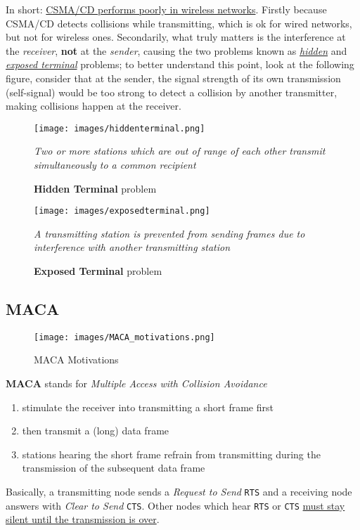 In short: \ul{CSMA/CD performs poorly in wireless networks}.
Firstly because CSMA/CD detects collisions while transmitting, which is ok for wired networks, but not for wireless ones.
Secondarily, what truly matters is the interference at the \textit{receiver}, \textbf{not} at the \textit{sender}, causing the two problems known as \textit{\ul{hidden}} and \ul{\textit{exposed terminal}} problems;
to better understand this point, look at the following figure, consider that at the sender, the signal strength of its own transmission (self-signal) would be too strong to detect a collision by another transmitter, making collisions happen at the receiver.

\begin{figure}[htbp]
   \centering
   \texttt{[image: images/hiddenterminal.png]}
   \caption{\textbf{Hidden Terminal} problem}
   \textit{Two or more stations which are out of range of each other transmit simultaneously to a common
   recipient}
   \label{fig:hiddenterminal}
\end{figure}


\begin{figure}[htbp]
   \centering
   \texttt{[image: images/exposedterminal.png]}
   \caption{\textbf{Exposed Terminal} problem}
   \textit{A transmitting station is prevented from sending frames due to interference with another
   transmitting station}
   \label{fig:exposedterminal}
\end{figure}

\newpage
\subsection{MACA}
\begin{figure}[htbp]
   \centering
   \texttt{[image: images/MACA\_motivations.png]}
   \caption{MACA Motivations}
   \label{fig:MACA_motivations}
\end{figure}

\textbf{MACA} stands for \textit{Multiple Access with Collision Avoidance}
\begin{enumerate}
   \item stimulate the receiver into transmitting a short
   frame first
   \item then transmit a (long) data frame
   \item stations hearing the short frame refrain from
   transmitting during the transmission of the
   subsequent data frame
\end{enumerate}

Basically, a transmitting node sends a \textit{Request to Send} \texttt{RTS} and a receiving node answers with \textit{Clear to Send} \texttt{CTS}.
Other nodes which hear \texttt{RTS} or \texttt{CTS} \ul{must stay silent until the transmission is over}.

